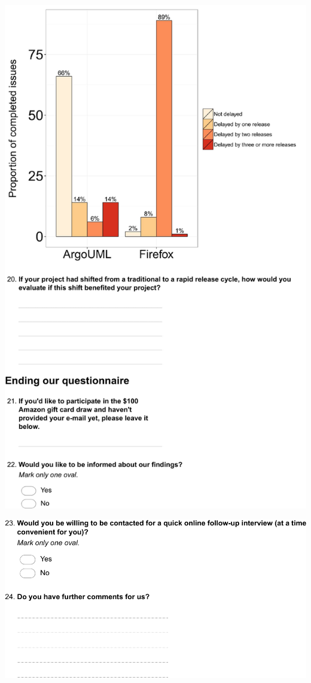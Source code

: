 \includegraphics[width=.9\textwidth]{chapters/chapter5/appendix/ArgoUML7.pdf}

\includegraphics[width=.9\textwidth]{chapters/chapter5/appendix/ArgoUML8.pdf}

